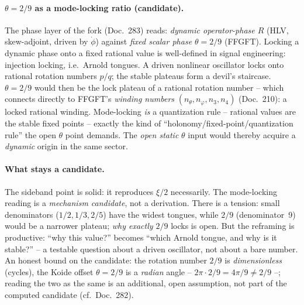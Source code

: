 \paragraph{$\theta=2/9$ as a mode-locking ratio (candidate).} The phase layer of the fork (Doc.~283)
reads: \emph{dynamic operator-phase $R$} (HLV, skew-adjoint, driven by $\dot\phi$) against \emph{fixed
scalar phase $\theta=2/9$} (FFGFT). Locking a dynamic phase onto a fixed rational value is
well-defined in signal engineering: injection locking, i.e.\ Arnold tongues. A driven nonlinear
oscillator locks onto rational rotation numbers $p/q$; the stable plateaus form a devil's staircase.
$\theta=2/9$ would then be the lock plateau of a rational rotation number -- which connects directly to
FFGFT's \emph{winding numbers} $(n_\theta,n_\varphi,n_3,n_4)$ (Doc.~210): a locked rational winding.
Mode-locking \emph{is} a quantization rule -- rational values are the stable fixed points -- exactly the
kind of \enquote{holonomy/fixed-point/quantization rule} the open $\theta$ point demands. The
\emph{open static} $\theta$ input would thereby acquire a \emph{dynamic} origin in the same sector.

\paragraph{What stays a candidate.} The sideband point is solid: it reproduces $\xi/2$ necessarily. The
mode-locking reading is a \emph{mechanism candidate}, not a derivation. There is a tension: small
denominators ($1/2,1/3,2/5$) have the widest tongues, while $2/9$ (denominator~9) would be a narrower
plateau; \emph{why exactly $2/9$} locks is open. But the reframing is productive: \enquote{why this
value?} becomes \enquote{which Arnold tongue, and why is it stable?} -- a testable question about a
driven oscillator, not about a bare number. An honest bound on the candidate: the rotation number $2/9$
is \emph{dimensionless} (cycles), the Koide offset $\theta=2/9$ is a \emph{radian} angle --
$2\pi\cdot2/9=4\pi/9\neq2/9$ --; reading the two as the same is an additional, open assumption, not part
of the computed candidate (cf.\ Doc.~282).

